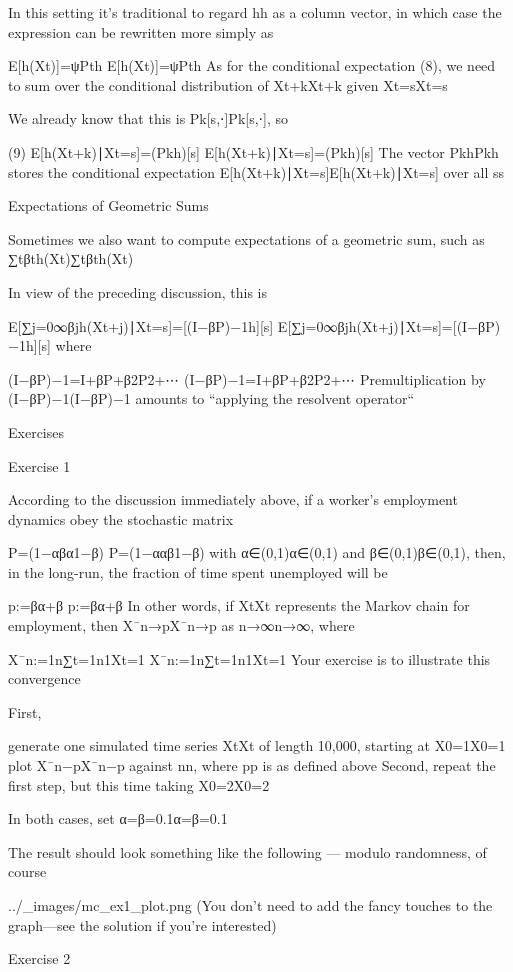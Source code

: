 In this setting it’s traditional to regard hh as a column vector, in which case the expression can be rewritten more simply as

E[h(Xt)]=ψPth
E[h(Xt)]=ψPth
As for the conditional expectation (8), we need to sum over the conditional distribution of Xt+kXt+k given Xt=sXt=s

We already know that this is Pk[s,⋅]Pk[s,⋅], so

(9)
E[h(Xt+k)∣Xt=s]=(Pkh)[s]
E[h(Xt+k)∣Xt=s]=(Pkh)[s]
The vector PkhPkh stores the conditional expectation E[h(Xt+k)∣Xt=s]E[h(Xt+k)∣Xt=s] over all ss

Expectations of Geometric Sums

Sometimes we also want to compute expectations of a geometric sum, such as ∑tβth(Xt)∑tβth(Xt)

In view of the preceding discussion, this is

E[∑j=0∞βjh(Xt+j)∣Xt=s]=[(I−βP)−1h][s]
E[∑j=0∞βjh(Xt+j)∣Xt=s]=[(I−βP)−1h][s]
where

(I−βP)−1=I+βP+β2P2+⋯
(I−βP)−1=I+βP+β2P2+⋯
Premultiplication by (I−βP)−1(I−βP)−1 amounts to “applying the resolvent operator“

Exercises

Exercise 1

According to the discussion immediately above, if a worker’s employment dynamics obey the stochastic matrix

P=(1−αβα1−β)
P=(1−ααβ1−β)
with α∈(0,1)α∈(0,1) and β∈(0,1)β∈(0,1), then, in the long-run, the fraction of time spent unemployed will be

p:=βα+β
p:=βα+β
In other words, if {Xt}{Xt} represents the Markov chain for employment, then X¯n→pX¯n→p as n→∞n→∞, where

X¯n:=1n∑t=1n1{Xt=1}
X¯n:=1n∑t=1n1{Xt=1}
Your exercise is to illustrate this convergence

First,

generate one simulated time series {Xt}{Xt} of length 10,000, starting at X0=1X0=1
plot X¯n−pX¯n−p against nn, where pp is as defined above
Second, repeat the first step, but this time taking X0=2X0=2

In both cases, set α=β=0.1α=β=0.1

The result should look something like the following — modulo randomness, of course

../_images/mc_ex1_plot.png
(You don’t need to add the fancy touches to the graph—see the solution if you’re interested)

Exercise 2

